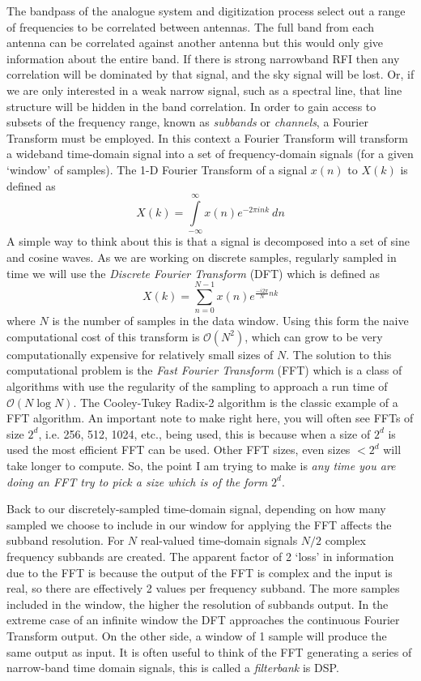\documentclass[usenatbib,usegraphicx]{article}
\begin{document}
The bandpass of the analogue system and digitization process select out a range of frequencies to be correlated between antennas.
The full band from each antenna can be correlated against another antenna but this would only give information about the entire band.
If there is strong narrowband RFI then any correlation will be dominated by that signal, and the sky signal will be lost.
Or, if we are only interested in a weak narrow signal, such as a spectral line, that line structure will be hidden in the band correlation.
In order to gain access to subsets of the frequency range, known as \emph{subbands} or \emph{channels}, a Fourier Transform must be employed.
In this context a Fourier Transform will transform a wideband time-domain signal into a set of frequency-domain signals (for a given `window' of samples).
The 1-D Fourier Transform of a signal $x(n)$ to $X(k)$ is defined as
%
\begin{equation}
\label{eq:fourier}
X(k)= \int\limits^{\infty}_{-\infty} x(n) e^{-2\pi i nk}~dn
\end{equation}
%
A simple way to think about this is that a signal is decomposed into a set of sine and cosine waves.
As we are working on discrete samples, regularly sampled in time we will use the \emph{Discrete Fourier Transform} (DFT) which is defined as
%
\begin{equation}
\label{eq:fourier}
X(k) = \sum^{N-1}_{n=0} x(n) e^{\frac{-i 2 \pi}{N} n k}
\end{equation}
%
where $N$ is the number of samples in the data window.
Using this form the naive computational cost of this transform is $\mathcal{O}(N^2)$, which can grow to be very computationally expensive for relatively small sizes of $N$.
The solution to this computational problem is the \emph{Fast Fourier Transform} (FFT) which is a class of algorithms with use the regularity of the sampling to approach a run time of $\mathcal{O}(N \log N)$.
The Cooley-Tukey Radix-2 algorithm is the classic example of a FFT algorithm.
An important note to make right here, you will often see FFTs of size $2^d$, i.e. 256, 512, 1024, etc., being used, this is because when a size of $2^d$ is used the most efficient FFT can be used.
Other FFT sizes, even sizes $<2^d$ will take longer to compute.
So, the point I am trying to make is \emph{any time you are doing an FFT try to pick a size which is of the form $2^d$}.

Back to our discretely-sampled time-domain signal, depending on how many sampled we choose to include in our window for applying the FFT affects the subband resolution.
For $N$ real-valued time-domain signals $N/2$ complex frequency subbands are created.
The apparent factor of 2 `loss' in information due to the FFT is because the output of the FFT is complex and the input is real, so there are effectively 2 values per frequency subband.
The more samples included in the window, the higher the resolution of subbands output.
In the extreme case of an infinite window the DFT approaches the continuous Fourier Transform output.
On the other side, a window of 1 sample will produce the same output as input.
It is often useful to think of the FFT generating a series of narrow-band time domain signals, this is called a \emph{filterbank} is DSP.
\end{document}
